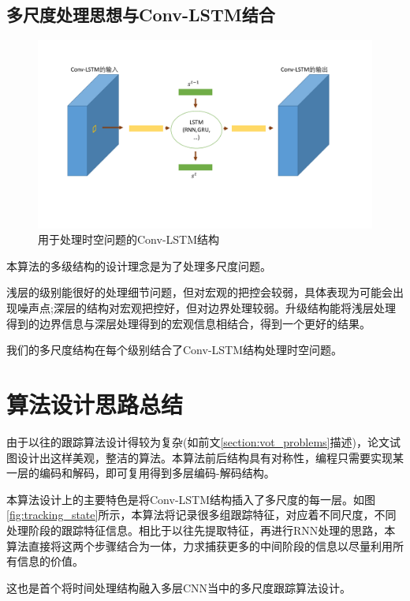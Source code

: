 \subsection{多尺度处理思想与Conv-LSTM结合} \label{section:multiscale}
\par
\begin{figure}[htbp!]
    \centering
    \includegraphics[width = 1.\textwidth]{chap/img/crnn.pdf}
    \caption{用于处理时空问题的Conv-LSTM结构}
    \label{fig:conv_lstm_arch}
\end{figure}
\par
本算法的多级结构的设计理念是为了处理多尺度问题。
\par
浅层的级别能很好的处理细节问题，但对宏观的把控会较弱，具体表现为可能会出现噪声点;深层的结构对宏观把控好，但对边界处理较弱。升级结构能将浅层处理得到的边界信息与深层处理得到的宏观信息相结合，得到一个更好的结果。
\par
我们的多尺度结构在每个级别结合了Conv-LSTM结构处理时空问题。

\section{算法设计思路总结}
由于以往的跟踪算法设计得较为复杂(如前文\ref{section:vot_problems}描述)，论文试图设计出这样美观，整洁的算法。本算法前后结构具有对称性，编程只需要实现某一层的编码和解码，即可复用得到多层编码-解码结构。
\par
本算法设计上的主要特色是将Conv-LSTM结构插入了多尺度的每一层。如图\ref{fig:tracking_state}所示，本算法将记录很多组跟踪特征，对应着不同尺度，不同处理阶段的跟踪特征信息。相比于以往先提取特征，再进行RNN处理的思路，本算法直接将这两个步骤结合为一体，力求捕获更多的中间阶段的信息以尽量利用所有信息的价值。
\par
这也是首个将时间处理结构融入多层CNN当中的多尺度跟踪算法设计。
